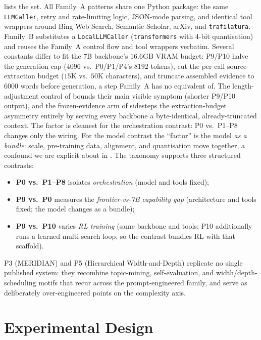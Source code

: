 \documentclass[11pt]{article}
\begin{document}
 lists the set. All Family~A patterns share one Python package:
the same \texttt{LLMCaller}, retry and rate-limiting logic, JSON-mode parsing, and
identical tool wrappers around Bing Web Search, Semantic Scholar, arXiv, and
\texttt{trafilatura}. Family~B substitutes a \texttt{LocalLLMCaller}
(\texttt{transformers} with 4-bit quantisation) and reuses the Family~A control flow
and tool wrappers verbatim. Several constants differ to fit the 7B backbone's
$16.6$GB VRAM budget: P9/P10 halve the generation cap ($4096$ vs.\ P0/P1/P4's $8192$
tokens), cut the per-call source-extraction budget ($15$K vs.\ $50$K characters), and
truncate assembled evidence to $6000$ words before generation, a step Family~A has no
equivalent of. The length-adjustment control of  bounds
their main visible symptom (shorter P9/P10 output), and the frozen-evidence arm of
 sidesteps the extraction-budget asymmetry entirely by serving every
backbone a byte-identical, already-truncated context. The factor is cleanest for the
orchestration contrast: P0 vs.\ P1--P8 changes only the wiring. For the model contrast the ``factor'' is the
model \emph{as a bundle}: scale, pre-training data, alignment, and quantisation move
together, a confound we are explicit about in . The taxonomy supports
three structured contrasts:
\begin{itemize}[leftmargin=1.4em,itemsep=1pt,topsep=2pt]
  \item \textbf{P0 vs.\ P1--P8} isolates \emph{orchestration} (model and tools fixed);
  \item \textbf{P9 vs.\ P0} measures the \emph{frontier-vs-7B capability gap}
        (architecture and tools fixed; the model changes as a bundle);
  \item \textbf{P9 vs.\ P10} varies \emph{RL training} (same backbone and tools; P10 additionally
        runs a learned multi-search loop, so the contrast bundles RL with that scaffold).
\end{itemize}
P3 (MERIDIAN) and P5 (Hierarchical Width-and-Depth) replicate no single published
system: they recombine topic-mining, self-evaluation, and
width/depth-scheduling motifs that recur across the prompt-engineered family, and
serve as deliberately over-engineered points on the complexity axis.

\section{Experimental Design}\label{sec:setup}
\end{document}
